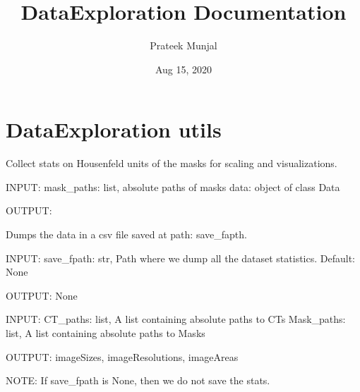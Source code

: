 \documentclass[letterpaper,10pt,english]{sphinxmanual}
\title{DataExploration Documentation}
\date{Aug 15, 2020}
\author{Prateek Munjal}
\begin{document}
\pagestyle{empty}
\sphinxmaketitle
\pagestyle{plain}
\sphinxtableofcontents
\pagestyle{normal}
\label{\detokenize{index::doc}}



\chapter{DataExploration utils}
\label{\detokenize{index:dataexploration-utils}}\label{\detokenize{index:module-utils}}

\begin{fulllineitems}
\label{\detokenize{index:utils.collect_hu_values}}
Collect stats on Housenfeld units of the masks for scaling and visualizations.

INPUT:
mask\_paths: list, absolute paths of masks
data: object of class Data

OUTPUT:

\end{fulllineitems}


\begin{fulllineitems}
\label{\detokenize{index:utils.dump_data}}
Dumps the data in a csv file saved at path: save\_fapth.

INPUT:
save\_fpath: str, Path where we dump all the dataset statistics. Default: None

OUTPUT:
None

\end{fulllineitems}


\begin{fulllineitems}
\label{\detokenize{index:utils.get_dataset_stats}}
INPUT:
CT\_paths: list, A list containing absolute paths to CTs
Mask\_paths: list, A list containing absolute paths to Masks

OUTPUT:
imageSizes, imageResolutions, imageAreas

NOTE:
If save\_fpath is None, then we do not save the stats.

\end{fulllineitems}
\end{document}
